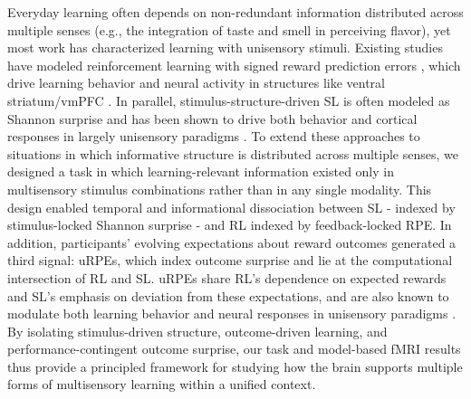 \documentclass{article}
\begin{document}
Everyday learning often depends on non-redundant information distributed across multiple senses (e.g., the integration of taste and smell in perceiving flavor), yet most work has characterized learning with unisensory stimuli. Existing studies have modeled reinforcement learning with signed reward prediction errors \cite{rescorla1972theory, 712192}, which drive learning behavior and neural activity in structures like ventral striatum/vmPFC \cite{niv2009reinforcement, Schultz1997, daw2011trial, o2003temporal, bartra2013valuation}. In parallel, stimulus-structure-driven SL is often modeled as Shannon surprise and has been shown to drive both behavior and cortical responses in largely unisensory paradigms \cite{meyniel2016human, konovalov2018neurocomputational, visalli2019bayesian, o2013dissociable}. To extend these approaches to situations in which informative structure is distributed across multiple senses, we designed a task in which learning-relevant information existed only in multisensory stimulus combinations rather than in any single modality. This design enabled temporal and informational dissociation between SL - indexed by stimulus-locked Shannon surprise - and RL indexed by feedback-locked RPE. In addition, participants’ evolving expectations about reward outcomes generated a third signal: uRPEs, which index outcome surprise and lie at the computational intersection of RL and SL. uRPEs share RL’s dependence on expected rewards and SL’s emphasis on deviation from these expectations, and are also known to modulate both learning behavior and neural responses in unisensory paradigms \cite{pearce1980model, fouragnan2018separate, corlett2022meta}. By isolating stimulus-driven structure, outcome-driven learning, and performance-contingent outcome surprise, our task and model-based fMRI results \cite{o2007model} thus provide a principled framework for studying how the brain supports multiple forms of multisensory learning within a unified context.\newline
\end{document}
